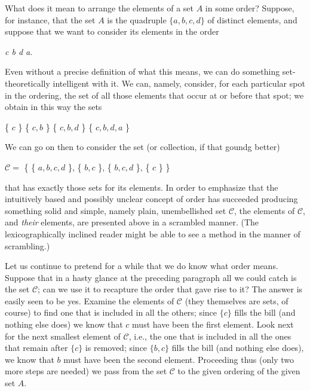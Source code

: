 

What does it mean to arrange the elements of a set $A$ in some order? Suppose, for instance, that the set $A$ is the quadruple $ \{a, b, c, d \} $ of distinct elements, and suppose that we want to consider its elements in the order 

\begin{center}
\textit{c b d a}.
\end{center}

Even without a precise definition of what this means, we can do something set-theoretically intelligent with it. We can, namely, consider, for each particular spot in the ordering, the set of all those elements that occur at or before that spot; we obtain in this way the sets 

\begin{center}
 \{ $c$ \}  \{ $c, b$ \} \{ $c, b, d$ \} \{ $c, b, d, a$ \} 
\end{center}

We can go on then to consider the set (or collection, if that goundg better) 

\begin{center}
$\mathcal{C} = $ \{ \{ $a, b, c, d$ \}, \{ $b, c$ \}, \{ $b, c, d$ \}, \{ $c$ \} \} 
\end{center}

that has exactly those sets for its elements. In order to emphasize that the intuitively based and possibly unclear concept of order has succeeded producing something solid and simple, namely plain,  unembellished set $ \mathcal{C} $, the elements of $ \mathcal{C} $, and \textit{their} elements, are presented above in a scrambled manner. (The lexicographically inclined reader might be able to see a method in the manner of scrambling.) 

Let us continue to pretend for a while that we do know what order means. Suppose that in a hasty glance at the preceding paragraph all we could catch is the set $\mathcal{C}$; can we use it to recapture the order that gave rise to it? The answer is easily seen to be yes. Examine the elements of $ \mathcal{C} $ (they themselves are sets, of course) to find one that is included in all the others; since $ \{c \}$ fills the bill (and nothing else does) we know that $c$ must have been the first element. Look next for the next smallest element of $ \mathcal{C}$, i.e., the one that is included in all the ones that remain after $ \{ c \} $ is removed; since $ \{ b, c \} $ fills the bill (and nothing else does), we know that $b$ must have been the second element. Proceeding thus (only two more steps are needed) we pass from the set $ \mathcal{C} $ to the given ordering of the given set $A$. 

